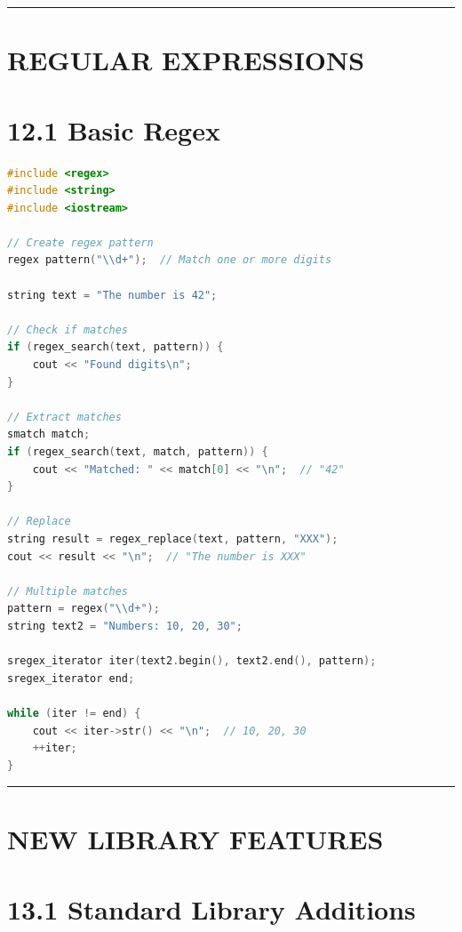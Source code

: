 \begin{center}\rule{0.5\linewidth}{0.5pt}\end{center}

\hypertarget{regular-expressions}{%
\section{REGULAR EXPRESSIONS}\label{regular-expressions}}

\hypertarget{basic-regex}{%
\section{12.1 Basic Regex}\label{basic-regex}}

\begin{lstlisting}[language={C++}]
#include <regex>
#include <string>
#include <iostream>

// Create regex pattern
regex pattern("\\d+");  // Match one or more digits

string text = "The number is 42";

// Check if matches
if (regex_search(text, pattern)) {
    cout << "Found digits\n";
}

// Extract matches
smatch match;
if (regex_search(text, match, pattern)) {
    cout << "Matched: " << match[0] << "\n";  // "42"
}

// Replace
string result = regex_replace(text, pattern, "XXX");
cout << result << "\n";  // "The number is XXX"

// Multiple matches
pattern = regex("\\d+");
string text2 = "Numbers: 10, 20, 30";

sregex_iterator iter(text2.begin(), text2.end(), pattern);
sregex_iterator end;

while (iter != end) {
    cout << iter->str() << "\n";  // 10, 20, 30
    ++iter;
}
\end{lstlisting}

\begin{center}\rule{0.5\linewidth}{0.5pt}\end{center}

\hypertarget{new-library-features}{%
\section{NEW LIBRARY FEATURES}\label{new-library-features}}

\hypertarget{standard-library-additions}{%
\section{13.1 Standard Library
Additions}\label{standard-library-additions}}

